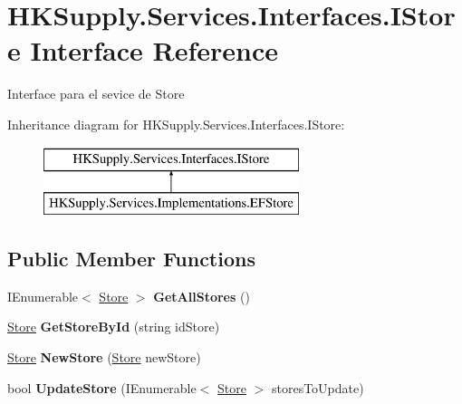 \hypertarget{interface_h_k_supply_1_1_services_1_1_interfaces_1_1_i_store}{}\section{H\+K\+Supply.\+Services.\+Interfaces.\+I\+Store Interface Reference}
\label{interface_h_k_supply_1_1_services_1_1_interfaces_1_1_i_store}


Interface para el sevice de Store  


Inheritance diagram for H\+K\+Supply.\+Services.\+Interfaces.\+I\+Store\+:\begin{figure}[H]
\begin{center}
\leavevmode
\includegraphics[height=2.000000cm]{interface_h_k_supply_1_1_services_1_1_interfaces_1_1_i_store}
\end{center}
\end{figure}
\subsection*{Public Member Functions}
\begin{DoxyCompactItemize}
\item 
\mbox{\label{interface_h_k_supply_1_1_services_1_1_interfaces_1_1_i_store_a9f063b0e41c6815010ca37e29ed823d6}} 
I\+Enumerable$<$ \hyperlink{class_h_k_supply_1_1_models_1_1_store}{Store} $>$ {\bfseries Get\+All\+Stores} ()
\item 
\mbox{\label{interface_h_k_supply_1_1_services_1_1_interfaces_1_1_i_store_ae14c258d604aa8c5b530642b9707de20}} 
\hyperlink{class_h_k_supply_1_1_models_1_1_store}{Store} {\bfseries Get\+Store\+By\+Id} (string id\+Store)
\item 
\mbox{\label{interface_h_k_supply_1_1_services_1_1_interfaces_1_1_i_store_a20a00f1cd6130e4acbda7212c9f1edf3}} 
\hyperlink{class_h_k_supply_1_1_models_1_1_store}{Store} {\bfseries New\+Store} (\hyperlink{class_h_k_supply_1_1_models_1_1_store}{Store} new\+Store)
\item 
\mbox{\label{interface_h_k_supply_1_1_services_1_1_interfaces_1_1_i_store_a9329bc091edb5e15a3ebf32222d85d5a}} 
bool {\bfseries Update\+Store} (I\+Enumerable$<$ \hyperlink{class_h_k_supply_1_1_models_1_1_store}{Store} $>$ stores\+To\+Update)
\end{DoxyCompactItemize}


